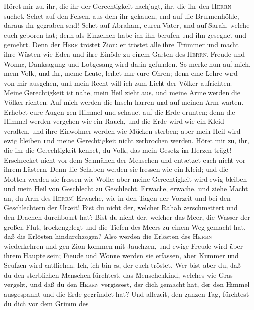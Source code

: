  Höret mir zu, ihr, die ihr der Gerechtigkeit nachjagt,
ihr, die ihr den \textsc{Herrn} suchet. Sehet auf den Felsen, aus dem
ihr gehauen, und auf die Brunnenhöhle, daraus ihr gegraben seid!
 Sehet auf Abraham, euren Vater, und auf Sarah, welche
euch geboren hat; denn als Einzelnen habe ich ihn berufen und ihn
gesegnet und gemehrt.  Denn der \textsc{Herr} tröstet
Zion; er tröstet alle ihre Trümmer und macht ihre Wüsten wie Eden und
ihre Einöde zu einem Garten des \textsc{Herrn}. Freude und Wonne,
Danksagung und Lobgesang wird darin gefunden.  So merke
nun auf mich, mein Volk, und ihr, meine Leute, leihet mir eure Ohren;
denn eine Lehre wird von mir ausgehen, und mein Recht will ich zum Licht
der Völker aufrichten.  Meine Gerechtigkeit ist nahe, mein
Heil zieht aus, und meine Arme werden die Völker richten. Auf mich
werden die Inseln harren und auf meinen Arm warten. 
Erhebet eure Augen gen Himmel und schauet auf die Erde drunten; denn die
Himmel werden vergehen wie ein Rauch, und die Erde wird wie ein Kleid
veralten, und ihre Einwohner werden wie Mücken sterben; aber mein Heil
wird ewig bleiben und meine Gerechtigkeit nicht zerbrochen werden.
 Höret mir zu, ihr, die ihr die Gerechtigkeit kennet, du
Volk, das mein Gesetz im Herzen trägt! Erschrecket nicht vor dem
Schmähen der Menschen und entsetzet euch nicht vor ihrem Lästern.
 Denn die Schaben werden sie fressen wie ein Kleid; und
die Motten werden sie fressen wie Wolle; aber meine Gerechtigkeit wird
ewig bleiben und mein Heil von Geschlecht zu Geschlecht. 
Erwache, erwache, und ziehe Macht an, du Arm des \textsc{Herrn}!
Erwache, wie in den Tagen der Vorzeit und bei den Geschlechtern der
Urzeit! Bist du nicht der, welcher Rahab zerschmettert und den Drachen
durchbohrt hat?  Bist du nicht der, welcher das Meer, die
Wasser der großen Flut, trockengelegt und die Tiefen des Meers zu einem
Weg gemacht hat, daß die Erlösten hindurchzogen?  Also
werden die Erlösten des \textsc{Herrn} wiederkehren und gen Zion kommen
mit Jauchzen, und ewige Freude wird über ihrem Haupte sein; Freude und
Wonne werden sie erfassen, aber Kummer und Seufzen wird entfliehen.
 Ich, ich bin es, der euch tröstet. Wer bist aber du, daß
du den sterblichen Menschen fürchtest, das Menschenkind, welches wie
Gras vergeht,  und daß du den \textsc{Herrn} vergissest,
der dich gemacht hat, der den Himmel ausgespannt und die Erde gegründet
hat? Und allezeit, den ganzen Tag, fürchtest du dich vor dem Grimm des
